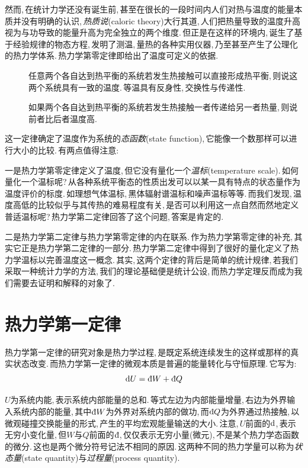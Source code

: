 然而,\,在统计力学还没有诞生前,\,甚至在很长的一段时间内人们对热与温度的能量本质并没有明确的认识,\,\emph{热质说}(caloric theory)大行其道,\,人们把热量导致的温度升高视为与功导致的能量升高为完全独立的两个维度.\,但正是在这样的环境内,\,诞生了基于经验规律的物态方程,\,发明了测温,\,量热的各种实用仪器,\,乃至甚至产生了公理化的热力学体系.\,热力学第零定律即给出了温度可定义的依据.
\begin{description}
	\item[\quad {}]		任意两个各自达到热平衡的系统若发生热接触可以直接形成热平衡,\,则说这两个系统具有一致的温度.\,等温具有反身性,\,交换性与传递性.
	\item[\quad {}]		如果两个各自达到热平衡的系统若发生热接触一者传递给另一者热量,\,则说前者比后者温度高.
\end{description}

这一定律确定了温度作为系统的\emph{态函数}(state function),\,它能像一个数那样可以进行大小的比较.\,有两点值得注意:

一是热力学第零定律定义了温度,\,但它没有量化一个\emph{温标}(temperature scale).\,如何量化一个温标呢?\,从各种系统平衡态的性质出发可以以某一具有特点的状态量作为温度评价的标度.\,如理想气体温标,\,黑体辐射谱温标和噪声温标等等.\,而我们发现,\,温度高低的比较似乎与其传热的难易程度有关,\,是否可以利用这一点自然而然地定义普适温标呢?\,热力学第二定律回答了这个问题,\,答案是肯定的.

二是热力学第二定律与热力学第零定律的内在联系.\,作为热力学第零定律的补充,\,其实它正是热力学第二定律的一部分.\,热力学第二定律中得到了很好的量化定义了热力学温标以完善温度这一概念.\,其实,\,这两个定律的背后是简单的统计规律,\,若我们采取一种统计力学的方法,\,我们的理论基础便是统计公设,\,而热力学定理反而成为我们需要去证明和解释的对象了.








\section{热力学第一定律}

热力学第一定律的研究对象是热力学过程,\,是既定系统连续发生的这样或那样的真实状态改变.\,而热力学第一定律的微观本质是普遍的能量转化与守恒原理.\,它写为:
\[\ud U=\dbar W+\dbar Q\]

$U$为系统内能,\,表示系统内部能量的总和.\,等式左边为内部能量增量,\,右边为外界输入系统内部的能量,\,其中$\dbar W$为外界对系统内部的做功,\,而$\dbar Q$为外界通过热接触,\,以微观碰撞交换能量的形式,\,产生的平均宏观能量输送的大小.\,注意,\,$U$前面的$\textrm{d}$,\,表示无穷小变化量,\,但$W$与$Q$前面的$\dbar$,\,仅仅表示无穷小量(微元),\,不是某个热力学态函数的微分.\,这也是两个微分符号记法不相同的原因.\,这两种不同的热力学量可以称为\emph{状态量}(state quantity)与\emph{过程量}(process quantity).

